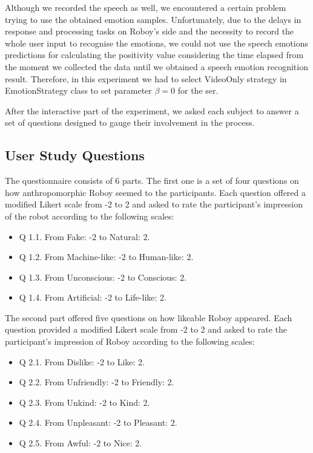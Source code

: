 Although we recorded the speech as well, we encountered a certain problem trying to use the obtained emotion samples. Unfortunately, due to the delays in response and processing tasks on Roboy's side and the necessity to record the whole user input to recognise the emotions, we could not use the speech emotions predictions for calculating the positivity value considering the time elapsed from the moment we collected the data until we obtained a speech emotion recognition result. Therefore, in this experiment we had to select VideoOnly strategy in EmotionStrategy class to set parameter \( \beta = 0\) for the \acrshort{ser}.

After the interactive part of the experiment, we asked each subject to answer a set of questions designed to gauge their involvement in the process. 

\subsection{User Study Questions}

The questionnaire consists of 6 parts. The first one is a set of four questions on how anthropomorphic Roboy seemed to the participants. Each question offered a modified Likert scale from -2 to 2 and asked to rate the participant's impression of the robot according to the following scales:
\begin{itemize}
    \item Q 1.1. From Fake: -2 to Natural: 2.
    \item Q 1.2. From Machine-like: -2 to Human-like: 2.
    \item Q 1.3. From Unconscious: -2 to Conscious: 2.
    \item Q 1.4. From Artificial: -2 to Life-like: 2.
\end{itemize}

The second part offered five questions on how likeable Roboy appeared. Each question provided a modified Likert scale from -2 to 2 and asked to rate the participant's impression of Roboy according to the following scales:
\begin{itemize}
    \item Q 2.1. From Dislike: -2 to Like: 2.
    \item Q 2.2. From Unfriendly: -2 to Friendly: 2.
    \item Q 2.3. From Unkind: -2 to Kind: 2.
    \item Q 2.4. From Unpleasant: -2 to Pleasant: 2.
    \item Q 2.5. From Awful: -2 to Nice: 2.
\end{itemize}

